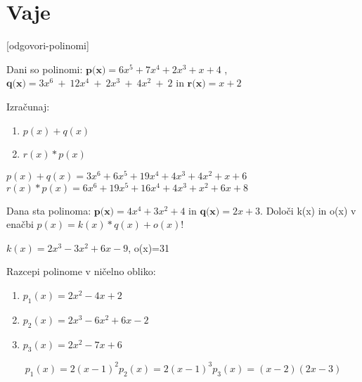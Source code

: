 \section{Vaje}
\label{sec:polinomi-funkcije-vaje}


\def\datotekaOdgovori{odgovori-polinomi}

[\datotekaOdgovori]

%

\begin{vaja}
  Dani so polinomi: $\textbf{p(x)}=6x^5+7x^4+2x^3+x+4$ , 
$\textbf{q(x)}=3x^6~+~12x^4~+~2x^3~+~4x^2~+~2$ in $\textbf{r(x)}=x+2$

Izračunaj: 
\begin{enumerate}
\item $p(x)+q(x)$ 
\item $r(x)*p(x)$
\end{enumerate}

  \begin{odgovor}
    $p(x)+q(x)=3x^6+6x^5+19x^4+4x^3+4x^2+x+6$
$r(x)*p(x)= 6x^6+19x^5+16x^4+4x^3+x^2+6x+8$
  \end{odgovor}
\end{vaja}


\begin{vaja}
 Dana sta polinoma:  $\textbf{p(x)}=4x^4+3x^2+4$ in $\textbf{q(x)}=2x+3$. Določi k(x) in o(x) v enačbi $p(x)=k(x)*q(x)+o(x)$!

  \begin{odgovor}
    $k(x)=2x^3-3x^2+6x-9$, o(x)=31
  \end{odgovor}
\end{vaja}

\begin{vaja}
 Razcepi polinome v ničelno obliko:
\begin{enumerate}
\item $p_1(x)=2x^2-4x+2$
\item $p_2(x)= 2x^3-6x^2+6x-2$
\item $p_3(x)=2x^2-7x+6$
\end{enumerate}
  \begin{odgovor}
   \[
p_1(x)=2(x-1)^2
p_2(x)=2(x-1)^3
p_3(x)=(x-2)(2x-3)
\] 
 \end{odgovor}
\end{vaja}

